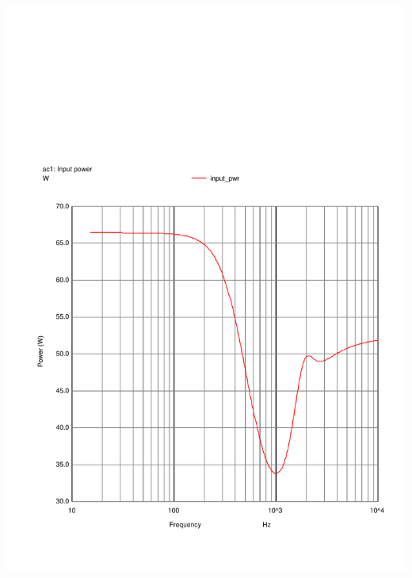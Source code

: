\documentclass[10pt]{article}
\begin{document}
\begin{multicols}{2}
	\includegraphics[scale=0.35,page=1]{../crossover/ngspice/in_pwr.pdf}

\end{multicols}
\end{document}
